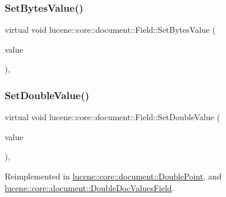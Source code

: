 \mbox{\label{classlucene_1_1core_1_1document_1_1Field_af61fb82abf8a917ccd5c9f252dcfa447}} 
\subsubsection{\texorpdfstring{Set\+Bytes\+Value()}{SetBytesValue()}\hspace{0.1cm}{\footnotesize\ttfamily [3/3]}}
{\footnotesize\ttfamily virtual void lucene\+::core\+::document\+::\+Field\+::\+Set\+Bytes\+Value (\begin{DoxyParamCaption}\item[{\mbox{\hyperlink{classlucene_1_1core_1_1util_1_1BytesRef}{lucene\+::core\+::util\+::\+Bytes\+Ref}} \&\&}]{value }\end{DoxyParamCaption})\hspace{0.3cm}{\ttfamily [inline]}, {\ttfamily [virtual]}}

\mbox{\label{classlucene_1_1core_1_1document_1_1Field_a8db791d4d1ebf77288d8529214413810}} 
\subsubsection{\texorpdfstring{Set\+Double\+Value()}{SetDoubleValue()}}
{\footnotesize\ttfamily virtual void lucene\+::core\+::document\+::\+Field\+::\+Set\+Double\+Value (\begin{DoxyParamCaption}\item[{\mbox{\hyperlink{ZlibCrc32_8h_a2c212835823e3c54a8ab6d95c652660e}{const}} double}]{value }\end{DoxyParamCaption})\hspace{0.3cm}{\ttfamily [inline]}, {\ttfamily [virtual]}}



Reimplemented in \mbox{\hyperlink{classlucene_1_1core_1_1document_1_1DoublePoint_a71a14c1578c356e006c422f2c8a267b8}{lucene\+::core\+::document\+::\+Double\+Point}}, and \mbox{\hyperlink{classlucene_1_1core_1_1document_1_1DoubleDocValuesField_a1fe376e9158ee03034fd48fe259926ea}{lucene\+::core\+::document\+::\+Double\+Doc\+Values\+Field}}.

